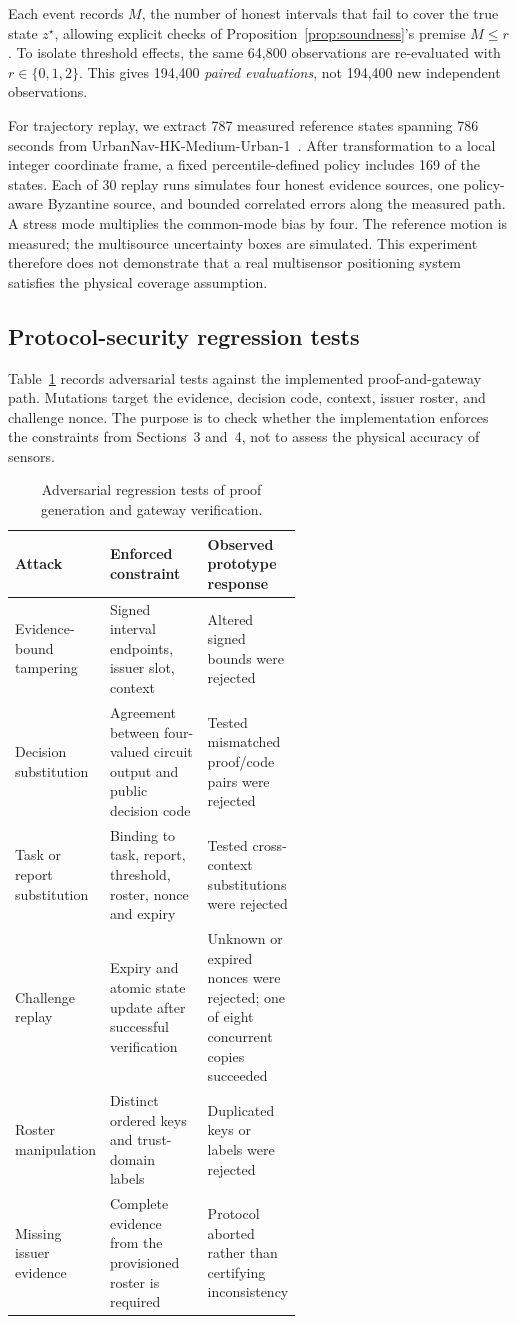 Each event records $M$, the number of honest intervals that fail to cover the true state $z^\star$, allowing explicit checks of Proposition~\ref{prop:soundness}'s premise $M\le r$. To isolate threshold effects, the same 64,800 observations are re-evaluated with $r\in\{0,1,2\}$. This gives 194,400 \emph{paired evaluations}, not 194,400 new independent observations.

For trajectory replay, we extract 787 measured reference states spanning 786 seconds from UrbanNav-HK-Medium-Urban-1~\cite{UrbanNav}. After transformation to a local integer coordinate frame, a fixed percentile-defined policy includes 169 of the states. Each of 30 replay runs simulates four honest evidence sources, one policy-aware Byzantine source, and bounded correlated errors along the measured path. A stress mode multiplies the common-mode bias by four. The reference motion is measured; the multisource uncertainty boxes are simulated. This experiment therefore does not demonstrate that a real multisensor positioning system satisfies the physical coverage assumption.

\subsection{Protocol-security regression tests}
Table~\ref{tab:security-validation} records adversarial tests against the implemented proof-and-gateway path. Mutations target the evidence, decision code, context, issuer roster, and challenge nonce. The purpose is to check whether the implementation enforces the constraints from Sections~3 and~4, not to assess the physical accuracy of sensors.

\begin{table}[htbp]\centering\small
\caption{Adversarial regression tests of proof generation and gateway verification.}\label{tab:security-validation}
\begin{tabularx}{\linewidth}{@{}p{0.22\linewidth}p{0.35\linewidth}X@{}}\toprule
Attack & Enforced constraint & Observed prototype response\\\midrule
Evidence-bound tampering & Signed interval endpoints, issuer slot, context & Altered signed bounds were rejected\\
Decision substitution & Agreement between four-valued circuit output and public decision code & Tested mismatched proof/code pairs were rejected\\
Task or report substitution & Binding to task, report, threshold, roster, nonce and expiry & Tested cross-context substitutions were rejected\\
Challenge replay & Expiry and atomic state update after successful verification & Unknown or expired nonces were rejected; one of eight concurrent copies succeeded\\
Roster manipulation & Distinct ordered keys and trust-domain labels & Duplicated keys or labels were rejected\\
Missing issuer evidence & Complete evidence from the provisioned roster is required & Protocol aborted rather than certifying inconsistency\\\bottomrule
\end{tabularx}\end{table}

